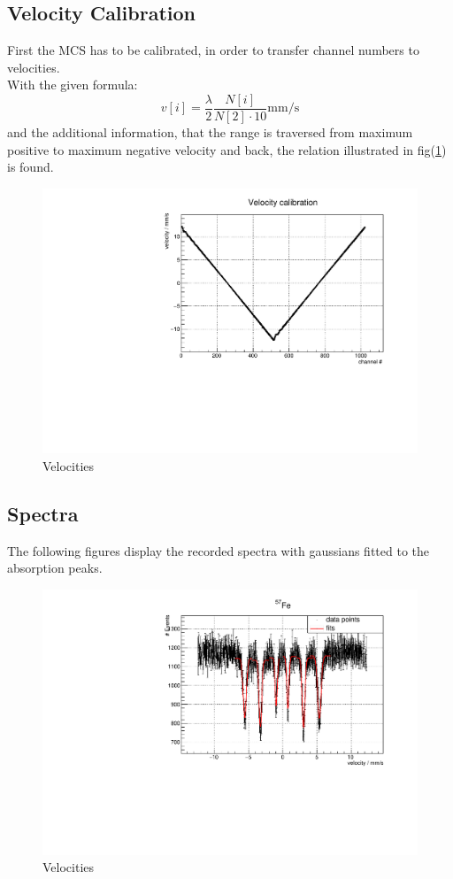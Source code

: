 \subsection{Velocity Calibration}

First the MCS has to be calibrated, in order to transfer channel numbers to velocities.\\
With the given formula:
$$v[i] = \frac{\lambda}{2} \frac{N[i]}{N[2] \cdot 10} \text{mm} / \text{s}$$
and the additional information, that the range is traversed from maximum positive to maximum negative velocity and back, the relation illustrated in fig(\ref{fig:vcal}) is found.

\begin{figure}
\label{fig:vcal}
\centering
\includegraphics[scale = 0.5]{../plots/velocities.pdf}
\caption{Velocities}
\end{figure}


\FloatBarrier
\subsection{Spectra}
The following figures display the recorded spectra with gaussians fitted to the absorption peaks.

\begin{figure}
\label{fig:fe}
\centering
\includegraphics[scale = 0.5]{../plots/Fe57.pdf}
\caption{Velocities}
\end{figure}


